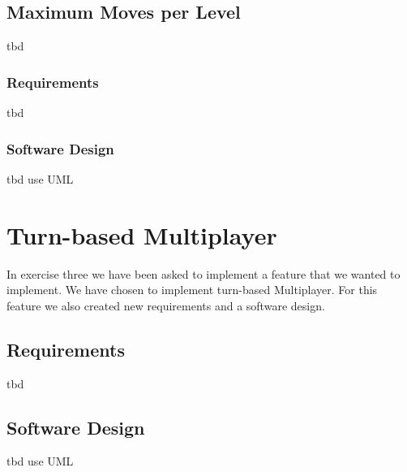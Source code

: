 \documentclass{article}
\begin{document}
\subsection{Maximum Moves per Level}
tbd

\subsubsection{Requirements}
tbd

\subsubsection{Software Design}
tbd {use UML}


\section{Turn-based Multiplayer}
In exercise three we have been asked to implement a feature that we wanted to implement. We have chosen to implement turn-based Multiplayer. For this feature we also created new requirements and a software design.

\subsection{Requirements}
tbd

\subsection{Software Design}
tbd {use UML}
\end{document}
